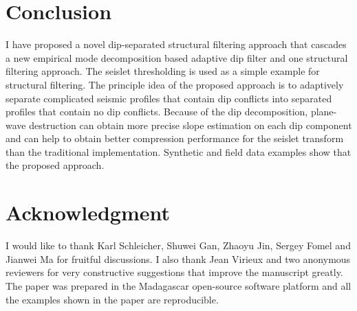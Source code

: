 \section{Conclusion}
I have proposed a novel  dip-separated structural filtering approach that cascades a new empirical mode decomposition based adaptive dip filter and one structural filtering approach. The seislet thresholding is used as a simple example for structural filtering. The principle idea of the proposed approach is to adaptively separate complicated seismic profiles that contain dip conflicts into separated profiles that contain no dip conflicts.   Because of the dip decomposition, plane-wave destruction can obtain more precise slope estimation on each  dip component and can help to obtain better compression performance for the seislet transform than the traditional implementation. Synthetic and field data examples show that the proposed approach.

\section{Acknowledgment}
I would like to thank Karl Schleicher, Shuwei Gan, Zhaoyu Jin, Sergey Fomel and Jianwei Ma for fruitful discussions. I also thank Jean Virieux and two anonymous reviewers for very constructive suggestions that improve the manuscript greatly. The paper was prepared in the Madagascar \cite[]{mada2013} open-source software platform and all the examples shown in the paper are reproducible.

